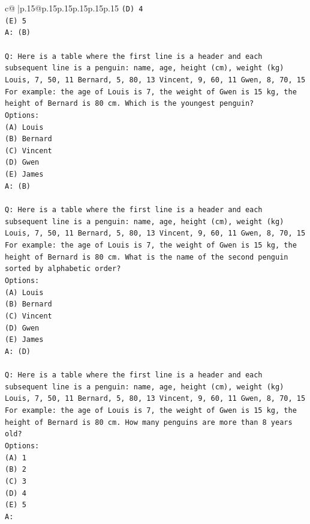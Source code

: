 \documentclass{article}
\begin{document}
{\begin{supertabular}{c@{$\;$}|p{.15\linewidth}@{}p{.15\linewidth}p{.15\linewidth}p{.15\linewidth}p{.15\linewidth}p{.15\linewidth}}
{{{\texttt{(D) 4} \\
\texttt{(E) 5} \\
\texttt{A: (B)} \\
\\ 
\texttt{Q: Here is a table where the first line is a header and each subsequent line is a penguin:  name, age, height (cm), weight (kg) Louis, 7, 50, 11 Bernard, 5, 80, 13 Vincent, 9, 60, 11 Gwen, 8, 70, 15  For example: the age of Louis is 7, the weight of Gwen is 15 kg, the height of Bernard is 80 cm.  Which is the youngest penguin?} \\
\texttt{Options:} \\
\texttt{(A) Louis} \\
\texttt{(B) Bernard} \\
\texttt{(C) Vincent} \\
\texttt{(D) Gwen} \\
\texttt{(E) James} \\
\texttt{A: (B)} \\
\\ 
\texttt{Q: Here is a table where the first line is a header and each subsequent line is a penguin:  name, age, height (cm), weight (kg) Louis, 7, 50, 11 Bernard, 5, 80, 13 Vincent, 9, 60, 11 Gwen, 8, 70, 15  For example: the age of Louis is 7, the weight of Gwen is 15 kg, the height of Bernard is 80 cm.  What is the name of the second penguin sorted by alphabetic order?} \\
\texttt{Options:} \\
\texttt{(A) Louis} \\
\texttt{(B) Bernard} \\
\texttt{(C) Vincent} \\
\texttt{(D) Gwen} \\
\texttt{(E) James} \\
\texttt{A: (D)} \\
\\ 
\texttt{Q: Here is a table where the first line is a header and each subsequent line is a penguin:  name, age, height (cm), weight (kg) Louis, 7, 50, 11 Bernard, 5, 80, 13 Vincent, 9, 60, 11 Gwen, 8, 70, 15  For example: the age of Louis is 7, the weight of Gwen is 15 kg, the height of Bernard is 80 cm.  How many penguins are more than 8 years old?} \\
\texttt{Options:} \\
\texttt{(A) 1} \\
\texttt{(B) 2} \\
\texttt{(C) 3} \\
\texttt{(D) 4} \\
\texttt{(E) 5} \\
\texttt{A:} \\
            }
        }
    }
     \\ \\


\end{supertabular}}
\end{document}
